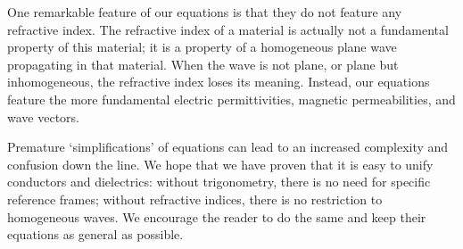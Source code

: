\begin{refsection}
One remarkable feature of our equations is that they do not feature any refractive index.
The refractive index of a material is actually not a fundamental property of this material; it is a property of a homogeneous plane wave propagating in that material.
When the wave is not plane, or plane but inhomogeneous, the refractive index loses its meaning.
Instead, our equations feature the more fundamental electric permittivities, magnetic permeabilities, and wave vectors.

Premature `simplifications' of equations can lead to an increased complexity and confusion down the line.
We hope that we have proven that it is easy to unify conductors and dielectrics:
without trigonometry, there is no need for specific reference frames;
without refractive indices, there is no restriction to homogeneous waves.
We encourage the reader to do the same and keep their equations as general as possible.



\end{refsection}
